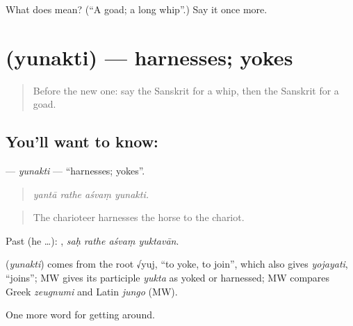 \begin{tcolorbox}[breakable,colback=teal!4,colframe=teal!35!black,title={Before you move on}]
What does  mean? (\textquotedblleft{}A goad; a long whip\textquotedblright{}.) Say it once more.
\end{tcolorbox}
\section[\texorpdfstring{\sk{युनक्ति} (yunakti)}{युनक्ति (yunakti)}]{ (yunakti) — harnesses; yokes}

\label{lesson:SA-C407-yunakti}



\begin{quote}
Before the new one: say the Sanskrit for a whip, then the Sanskrit for a goad.
\end{quote}

\subsection*{You'll want to know: }
\textbf{} — \emph{yunakti} — \textquotedblleft{}harnesses; yokes\textquotedblright{}.

\begin{quote}
   
\end{quote}

\begin{quote}
\emph{yantā rathe aśvaṃ yunakti.}
\end{quote}

\begin{quote}
The charioteer harnesses the horse to the chariot.
\end{quote}

Past (he …):    , \emph{saḥ rathe aśvaṃ yuktavān}.

\begin{cousinweb}
\textbf{} (\emph{yunakti}) comes from the root √yuj, \textquotedblleft{}to yoke, to join\textquotedblright{}, which also gives \emph{yojayati}, \textquotedblleft{}joins\textquotedblright{}; MW gives its participle \emph{yukta} as yoked or harnessed; MW compares Greek \emph{zeugnumi} and Latin \emph{jungo} (MW).
\end{cousinweb}

\begin{grammarlens}[title={What you've built}]
One more word for getting around.
\end{grammarlens}

